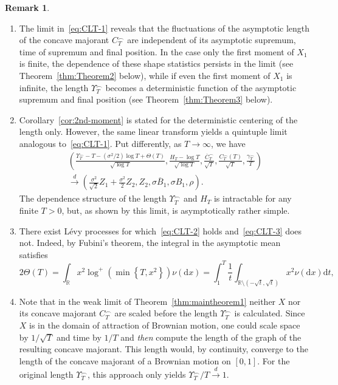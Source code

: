 \documentclass[10pt]{amsart}
\theoremstyle{definition}\newtheorem{defi}[theo]{Definition}\newtheorem{rema}[theo]{Remark}\newtheorem{exam}[theo]{Example}\newtheorem{exem}[theo]{Example}\newtheorem{nota}[theo]{Notation}
\newcommand\R{\mathbb{R}}
\newcommand\1{\mathds{1}}
\newcommand\D{\mathrm{d}}
\newcommand\cid{\xrightarrow{d}}
\newcommand\ov[1]{\overline{#1}}
\newcommand*{\romanenumi}{\renewcommand*{\theenumi}{\roman{enumi}}}
\begin{document}
\begin{rema}
\leavevmode
\begin{enumerate}\romanenumi
\item\label{rema1.3.i} The limit in~\eqref{eq:CLT-1} reveals that the fluctuations of the asymptotic length of the concave majorant $C_T^\frown$ are independent of its asymptotic supremum, time of supremum and final position. In the case only the first moment of $X_1$ is finite, the dependence of these shape statistics persists in the limit (see Theorem~\ref{thm:Theorem2} below), while if even the first moment of $X_1$ is infinite, the length $\Upsilon_T^\frown$ becomes a deterministic function of the asymptotic supremum and final position (see Theorem~\ref{thm:Theorem3} below).
\item\label{rema1.3.ii} Corollary~\ref{cor:2nd-moment} is stated for the deterministic centering of the length only. However, the same linear transform yields a quintuple limit analogous to~\eqref{eq:CLT-1}. Put differently, as $T\to\infty$, we have
\begin{multline*}
\left(
\frac{\Upsilon_T^{\frown} -T-\left(\sigma^2/2\right)\log T +\Theta(T)}{\sqrt{\log T}},
\frac{H_T-\log T}{\sqrt{\log T}},
\frac{\ov{C}^\frown_T}{\sqrt{T}},
\frac{C^\frown_T(T)}{\sqrt{T}},
\frac{\gamma^\frown_T}{T}
\right)\\
\cid
\left(
\frac{\sigma^2}{\sqrt{2}}Z_1+\frac{\sigma^2}{2}Z_2, Z_2,
\sigma\ov B_1,
\sigma B_1,
\rho
\right).
\end{multline*}
The dependence structure of the length $\Upsilon_T^\frown$ and $H_T$ is intractable for any finite $T>0$, but, as shown by this limit, is asymptotically rather simple.
\item\label{rema1.3.iii} There exist Lévy processes for which~\eqref{eq:CLT-2} holds and~\eqref{eq:CLT-3} does not. Indeed, by Fubini's theorem, the integral in the asymptotic mean satisfies
\[
2\Theta(T) =\int_\R x^2\log^+\left(\min\left\{T, x^2\right\}\right)\nu(\D x) =\int_1^T\frac{1}{t}\int_{\R\setminus\left(-\sqrt{t},\sqrt{t}\right)} x^2\nu(\D x)\D t,
\]
\item\label{rema1.3.iv} Note that in the weak limit of Theorem~\ref{thm:maintheorem1} neither $X$ nor its concave majorant $C_T^\frown$ are scaled before the length $\Upsilon_T^\frown$ is calculated. Since $X$ is in the domain of attraction of Brownian motion, one could scale space by $1/\sqrt{T}$ and time by $1/T$ and \emph{then} compute the length of the graph of the resulting concave majorant. This length would, by continuity, converge to the length of the concave majorant of a Brownian motion on $[0,1]$. For the original length $\Upsilon_T^\frown$, this approach only yields $\Upsilon_T^\frown/T\cid 1$.

\end{enumerate}
\end{rema}
\end{document}
